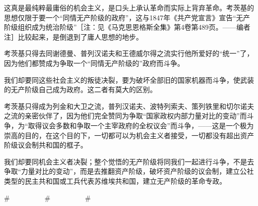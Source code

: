\documentclass[UTF8, 12pt, a4paper]{ctexrep}
\begin{document}
这真是最纯粹最庸俗的机会主义，是口头上承认革命而实际上背弃革命。考茨基的思想仅限于要一个“同情无产阶级的政府”，这与1847年《共产党宣言》宣告“无产阶级组织成为统治阶级”［注：见《马克思恩格斯全集》第4卷第489页。——编者注］比较起来，是倒退到了庸人思想的地步。

考茨基只得去同谢德曼、普列汉诺夫和王德威尔得之流实行他所爱好的“统一”了，因为他们都赞成为争取一个“同情无产阶级的”政府而斗争。

我们却要同这些社会主义的叛徒决裂，要为破坏全部旧的国家机器而斗争，使武装的无产阶级自己成为政府。这二者有莫大的区别。

考茨基只得成为列金和大卫之流，普列汉诺夫、波特列索夫、策列铁里和切尔诺夫之流的亲密伙伴了，因为他们完全赞同为争取“国家政权内部力量对比的变动”而斗争，为“取得议会多数和争取一个主宰政府的全权议会”而斗争，——这是一个极为崇高的目的，在这个目的下，一切都可以为机会主义者接受，一切都没有超出资产阶级议会制共和国的框子。

我们却要同机会主义者决裂；整个觉悟的无产阶级将同我们一起进行斗争，不是去争取“力量对比的变动”，而是去推翻资产阶级，破坏资产阶级的议会制，建立公社类型的民主共和国或工兵代表苏维埃共和国，建立无产阶级的革命专政。

\#　　　　　\#　　　　　\#
\end{document}
